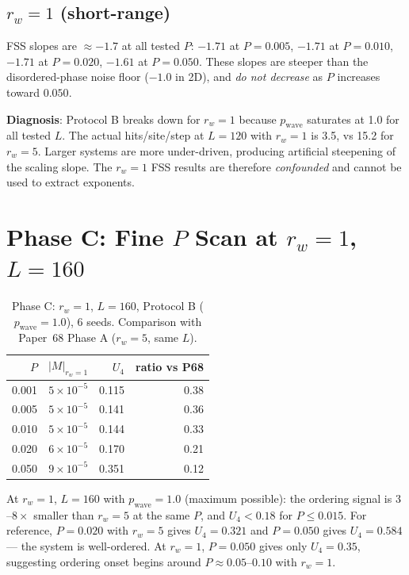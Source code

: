 \documentclass[twocolumn,10pt]{article}
\begin{document}
\subsection{$r_w = 1$ (short-range)}

FSS slopes are $\approx-1.7$ at all tested $P$:
$-1.71$ at $P=0.005$, $-1.71$ at $P=0.010$, $-1.71$ at $P=0.020$, $-1.61$ at $P=0.050$.
These slopes are steeper than the disordered-phase noise floor ($-1.0$ in 2D),
and \emph{do not decrease} as $P$ increases toward $0.050$.

\textbf{Diagnosis}: Protocol B breaks down for $r_w=1$ because $p_\mathrm{wave}$
saturates at 1.0 for all tested $L$.
The actual hits/site/step at $L=120$ with $r_w=1$ is 3.5, vs 15.2 for $r_w=5$.
Larger systems are more under-driven, producing artificial steepening of the
scaling slope.
The $r_w=1$ FSS results are therefore \emph{confounded} and cannot be used to
extract exponents.

\section{Phase C: Fine $P$ Scan at $r_w=1$, $L=160$}

\begin{table}[h]
\centering
\caption{Phase C: $r_w=1$, $L=160$, Protocol B ($p_\mathrm{wave}=1.0$), 6 seeds.
Comparison with Paper~68 Phase A ($r_w=5$, same $L$).}
\label{tab:phaseC}
\begin{tabular}{rrrr}
\toprule
$P$ & $|M|_{r_w=1}$ & $U_4$ & ratio vs P68 \\
\midrule
0.001 & $5\times10^{-5}$ & 0.115 & 0.38 \\
0.005 & $5\times10^{-5}$ & 0.141 & 0.36 \\
0.010 & $5\times10^{-5}$ & 0.144 & 0.33 \\
0.020 & $6\times10^{-5}$ & 0.170 & 0.21 \\
0.050 & $9\times10^{-5}$ & 0.351 & 0.12 \\
\bottomrule
\end{tabular}
\end{table}

At $r_w=1$, $L=160$ with $p_\mathrm{wave}=1.0$ (maximum possible):
the ordering signal is $3$--$8\times$ smaller than $r_w=5$ at the same $P$,
and $U_4<0.18$ for $P\leq0.015$.
For reference, $P=0.020$ with $r_w=5$ gives $U_4=0.321$ and $P=0.050$ gives
$U_4=0.584$ --- the system is well-ordered.
At $r_w=1$, $P=0.050$ gives only $U_4=0.35$, suggesting ordering onset begins
around $P\approx0.05$--$0.10$ with $r_w=1$.
\end{document}

